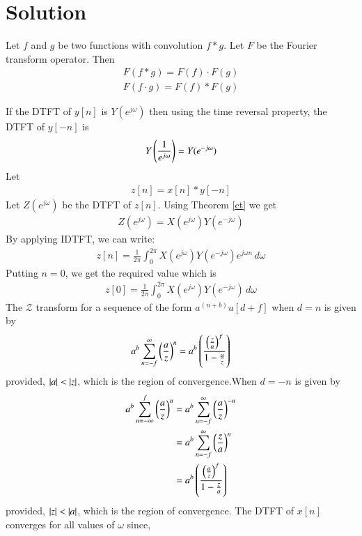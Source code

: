 \documentclass[journal,12pt,twocolumn]{IEEEtran}
\begin{document}
\section{Solution}
\begin{theorem} \label{ct}
Let $f$ and $g$ be two functions with convolution $f*g$. Let $F$ be the Fourier transform operator. Then
\begin{align}
F(f * g)=F(f) \cdot F(g)\\
F(f \cdot g)=F(f) * F(g)
\end{align}
\end{theorem}
If the DTFT of $y[n]$ is $Y(e^{j\omega})$  then using the time reversal property, the DTFT of $y[-n]$ is 
\begin{align}
Y\left(\frac{1}{e^{j\omega}}\right)=Y(e^{-j\omega})  
\end{align}
Let 
\begin{align} \label{convolu}
    z[n]=x[n]*y[-n]
\end{align}
Let $Z(e^{j\omega})$ be the DTFT of $z[n]$. Using Theorem \ref{ct} we get
\begin{align}
  Z(e^{j\omega})= X(e^{j\omega}) Y(e^{-j\omega}) 
\end{align}
By applying IDTFT, we can write:
\begin{align}
z[n]=\frac{1}{2\pi} \int_{0}^{2\pi} X(e^{j\omega}) Y(e^{-j\omega}) e^{j\omega n}\, d\omega  
\end{align}
Putting $n=0$, we get the required value which is
\begin{align}
z[0]=\frac{1}{2\pi} \int_{0}^{2\pi} X(e^{j\omega}) Y(e^{-j\omega})\, d\omega 
\end{align}
The $\mathcal{Z}$ transform for a sequence of the form $a^{(n+b)}u[d+f]$ when $d=n$ is given by
\begin{align}\label{Z1}
a^b\sum _{n=-f }^{\infty }\left(\frac{a}{z}\right)^n  
=a^b\left(\frac{\left(\frac{z}{a}\right)^f}{1-\frac{a}{z}}\right)
\end{align}
provided, $\vert a\vert<\vert z\vert$, which is the region of convergence.When $d=-n$ is given by
\begin{align}\label{Z2}
a^b\sum _{n=-\infty }^{f }\left(\frac{a}{z}\right)^n 
&=a^b\sum _{n=-f }^{\infty }\left(\frac{a}{z}\right)^{-n}\\
&=a^b\sum _{n=-f }^{\infty }\left(\frac{z}{a}\right)^n\\
&=a^b\left(\frac{\left(\frac{a}{z}\right)^f}{1-\frac{z}{a}}\right)
\end{align}
provided, $\vert z\vert<\vert a\vert$, which is the region of convergence.
The DTFT of $x[n]$ converges for all values of $\omega$ since,
\end{document}

